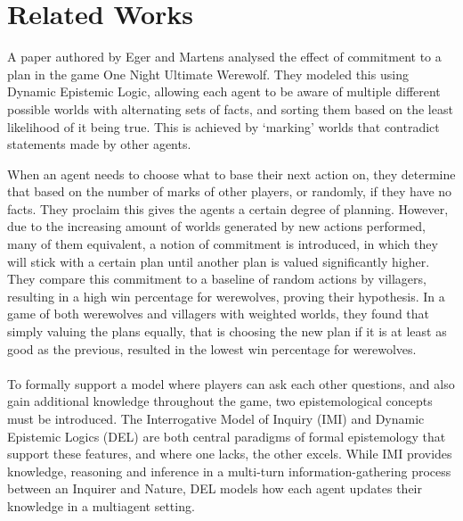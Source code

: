 \section{Related Works}
A paper authored by Eger and Martens\cite{commitment} analysed the effect of
commitment to a plan in the game One Night Ultimate Werewolf. They modeled
this using Dynamic Epistemic Logic, allowing each agent to be aware of multiple
different possible worlds with alternating sets of facts, and sorting them
based on the least likelihood of it being true. This is achieved by ‘marking’
worlds that contradict statements made by other agents. 

When an agent needs to choose what to base their next action on, they determine
that based on the number of marks of other players, or randomly, if they have
no facts. They proclaim this gives the agents a certain degree of planning.
However, due to the increasing amount of worlds generated by new actions
performed, many of them equivalent, a notion of commitment is introduced, in
which they will stick with a certain plan until another plan is valued
significantly higher. They compare this commitment to a baseline of random
actions by villagers, resulting in a high win percentage for werewolves,
proving their hypothesis. In a game of both werewolves and villagers with
weighted worlds, they found that simply valuing the plans equally, that is
choosing the new plan if it is at least as good as the previous, resulted in
the lowest win percentage for werewolves.\\ \\ To formally support a model
where players can ask each other questions, and also gain additional knowledge
throughout the game, two epistemological concepts must be introduced. The
Interrogative Model of Inquiry (IMI) and Dynamic Epistemic Logics (DEL) are
both central paradigms of formal epistemology that support these features, and
where one lacks, the other excels. While IMI provides knowledge, reasoning and
inference in a multi-turn information-gathering process between an Inquirer and
Nature, DEL models how each agent updates their knowledge in a multiagent
setting.

